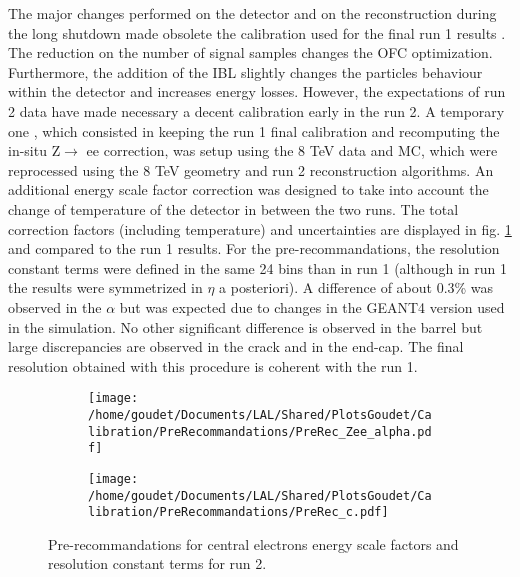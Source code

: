 \label{sec:Calibration_inSitu_secPreRec}
The major changes performed on the detector and on the reconstruction during the long shutdown made obsolete the calibration used for the final run 1 results \cite{CERN-PH-EP-2014-153}.
The reduction on the number of signal samples changes the OFC optimization.
Furthermore, the addition of the IBL slightly changes the particles behaviour within the detector and increases energy losses.
However, the expectations of run 2 data have made necessary a decent calibration early in the run 2.
A temporary one \cite{ATL-COM-PHYS-2015-1300,ATL-COM-PHYS-2016-841,ATL-COM-PHYS-2017-757}, which consisted in keeping the run 1 final calibration and recomputing the in-situ Z\(\rightarrow\) ee correction, was setup using the 8 TeV data and MC, which were reprocessed using the 8 TeV geometry and run 2 reconstruction algorithms.
An additional energy scale factor correction was designed to take into account the change of temperature of the detector in between the two runs.
The total correction factors (including temperature) and uncertainties are displayed in fig. \ref{orgb377ac3} and compared to the run 1 results.
For the pre-recommandations, the resolution constant terms were defined in the same 24 bins than in run 1 (although in run 1 the results were symmetrized in $\eta$ a posteriori).
A difference of about 0.3\% was observed in the \(\alpha\) but was expected due to changes in the GEANT4 version used in the simulation.
No other significant difference is observed in the barrel but large discrepancies are observed in the crack and in the end-cap.
The final resolution obtained with this procedure is coherent with the run 1.

\begin{figure}
\begin{subfigure}[t]{0.49\linewidth}
\begin{center}
\texttt{[image: /home/goudet/Documents/LAL/Shared/PlotsGoudet/Calibration/PreRecommandations/PreRec\_Zee\_alpha.pdf]}
\end{center}
\end{subfigure}
\begin{subfigure}[t]{0.49\linewidth}
\begin{center}
\texttt{[image: /home/goudet/Documents/LAL/Shared/PlotsGoudet/Calibration/PreRecommandations/PreRec\_c.pdf]}
\end{center}
\end{subfigure}
\caption{\label{orgb377ac3}
Pre-recommandations for central electrons energy scale factors and resolution constant terms for run 2.}
\end{figure}

